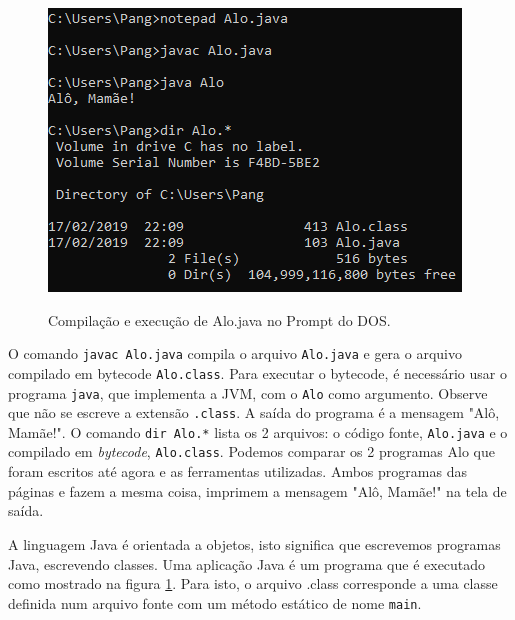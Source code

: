 \documentclass[
	12pt,				%
	twoside,			%
	a4paper,			%
	english,			%
	french,				%
	spanish,			%
	brazil				%
	]{abntex2}
\begin{document}
\begin{figure}[h]
\begin{center}
\includegraphics[scale=0.4]{compErunAlo.png} 
\caption{Compilação e execução de Alo.java no Prompt do DOS.}
\label{fig:dosExecAlo}
\end{center}
\end{figure}

O comando \texttt{javac Alo.java} compila o arquivo \texttt{Alo.java} e gera o arquivo compilado em bytecode \texttt{Alo.class}. Para executar o bytecode, é necessário usar o programa \texttt{java}, que implementa a JVM, com o \texttt{Alo} como argumento. Observe que não se escreve a extensão \texttt{.class}. A saída do programa é a mensagem "Alô, Mamãe!". O comando \texttt{dir Alo.*} lista os 2 arquivos: o código fonte, \texttt{Alo.java} e o compilado em \textit{bytecode}, \texttt{Alo.class}. Podemos comparar os 2 programas Alo que foram escritos até agora e as ferramentas utilizadas. Ambos programas das páginas \pageref{fig:code} e \pageref{prog:Alo1} fazem a mesma coisa, imprimem a mensagem "Alô, Mamãe!" na tela de saída.

A linguagem Java é orientada a objetos, isto significa que escrevemos programas Java, escrevendo classes. Uma aplicação Java é um programa que é executado como mostrado na figura \ref{fig:dosExecAlo}. Para isto, o arquivo .class corresponde a uma classe definida num arquivo fonte com um método estático de nome \texttt{main}. 



\end{document}
